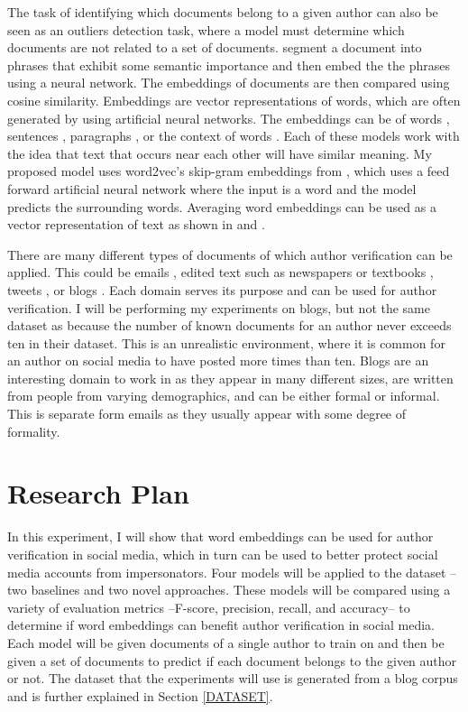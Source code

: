 \documentclass[11pt]{article}
\begin{document}
The task of identifying which documents belong to a given author can also be seen as an outliers detection task, where a model must determine which documents are not related to a set of documents. \cite{Zhuang} segment a document into phrases that exhibit some semantic importance and then embed the the phrases using a neural network. The embeddings of documents are then compared using cosine similarity. Embeddings are vector representations of words, which are often generated by using artificial neural networks. The embeddings can be of words \cite{Mikolov+:2013b}, sentences \cite{Kiros+:2015}, paragraphs \cite{Le:Mikolov:2014}, or the context of words \cite{melamud2016context2vec}. Each of these models work with the idea that text that occurs near each other will have similar meaning. My proposed model uses word2vec's skip-gram embeddings from \cite{Mikolov+:2013b}, which uses a feed forward artificial neural network where the input is a word and the model predicts the surrounding words. Averaging word embeddings can be used as a vector representation of text as shown in \cite{jabri2016revisiting} and \cite{king-cook:2017}.



There are many different types of documents of which author verification can be applied. This could be emails \cite{Schmid:2015}, edited text such as newspapers or textbooks \cite{Stamatatos_e.:overview}, tweets \cite{gritzalis}, or blogs \cite{pan2014}. Each domain serves its purpose and can be used for author verification. I will be performing my experiments on blogs, but not the same dataset as \cite{pan2014} because the number of known documents for an author never exceeds ten in their dataset. This is an unrealistic environment, where it is common for an author on social media to have posted more times than ten. Blogs are an interesting domain to work in as they appear in many different sizes, are written from people from varying demographics, and can be either formal or informal. This is separate form emails as they usually appear with some degree of formality.




\section{Research Plan}
In this experiment, I will show that word embeddings can be used for author verification in social media, which in turn can be used to better protect social media accounts from impersonators. Four models will be applied to the dataset --two baselines and two novel approaches. These models will be compared using a variety of evaluation metrics --F-score, precision, recall, and accuracy-- to determine if word embeddings can benefit author verification in social media. Each model will be given documents of a single author to train on and then be given a set of documents to predict if each document belongs to the given author or not. The dataset that the experiments will use is generated from a blog corpus and is further explained in Section \ref{DATASET}. 
\end{document}
